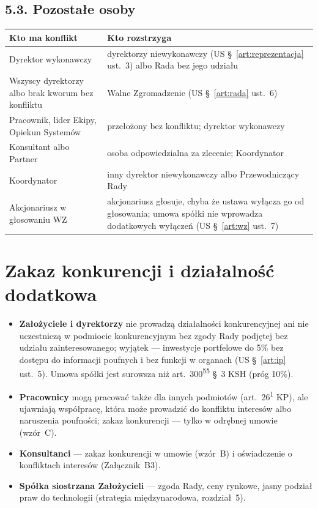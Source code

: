 \documentclass[11pt,a4paper]{report}
\newcommand{\US}[1]{US §~#1}
\begin{document}
\subsection*{5.3. Pozostałe osoby}

\begin{center}
\small
\begin{tabularx}{\linewidth}{@{}>{\raggedright\arraybackslash}p{4.2cm} X@{}}
\toprule
\textbf{Kto ma konflikt} & \textbf{Kto rozstrzyga} \\
\midrule
Dyrektor wykonawczy & dyrektorzy niewykonawczy (\US{\ref{art:reprezentacja} ust.~3}) albo Rada bez jego udziału \\
Wszyscy dyrektorzy albo brak kworum bez konfliktu & Walne Zgromadzenie (\US{\ref{art:rada} ust.~6}) \\
Pracownik, lider Ekipy, Opiekun Systemów & przełożony bez konfliktu; dyrektor wykonawczy \\
Konsultant albo Partner & osoba odpowiedzialna za zlecenie; Koordynator \\
Koordynator & inny dyrektor niewykonawczy albo Przewodniczący Rady \\
Akcjonariusz w głosowaniu WZ & akcjonariusz głosuje, chyba że ustawa wyłącza go od głosowania; umowa spółki nie wprowadza dodatkowych wyłączeń (\US{\ref{art:wz} ust.~7}) \\
\bottomrule
\end{tabularx}
\end{center}

\section{Zakaz konkurencji i działalność dodatkowa}

\begin{itemize}
  \item \textbf{Założyciele i dyrektorzy} nie prowadzą działalności konkurencyjnej ani nie uczestniczą w podmiocie konkurencyjnym bez zgody Rady podjętej bez udziału zainteresowanego; wyjątek --- inwestycje portfelowe do 5\% bez dostępu do informacji poufnych i bez funkcji w organach (\US{\ref{art:ip} ust.~5}). Umowa spółki jest surowsza niż art.~300\textsuperscript{55} §~3 KSH (próg 10\%).
  \item \textbf{Pracownicy} mogą pracować także dla innych podmiotów (art.~26\textsuperscript{1} KP), ale ujawniają współpracę, która może prowadzić do konfliktu interesów albo naruszenia poufności; zakaz konkurencji --- tylko w odrębnej umowie (wzór~C).
  \item \textbf{Konsultanci} --- zakaz konkurencji w umowie (wzór~B) i oświadczenie o konfliktach interesów (Załącznik~B3).
  \item \textbf{Spółka siostrzana Założycieli} --- zgoda Rady, ceny rynkowe, jasny podział praw do technologii (strategia międzynarodowa, rozdział~5).
\end{itemize}
\end{document}
